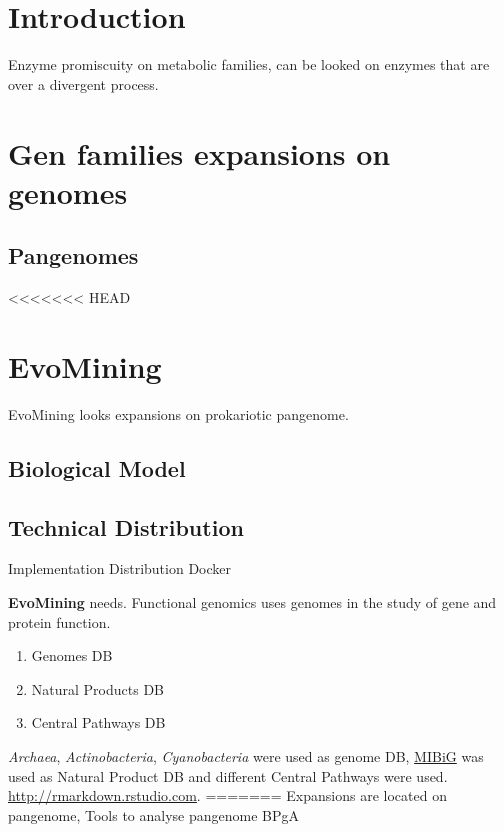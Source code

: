\documentclass[12pt,twoside]{reedthesis}
\providecommand{\tightlist}{%
  \setlength{\itemsep}{0pt}\setlength{\parskip}{0pt}}
\begin{document}
  \section{Introduction}\label{introduction-1}
  
  Enzyme promiscuity on metabolic families, can be looked on enzymes that
  are over a divergent process.
  
  \section{Gen families expansions on
  genomes}\label{gen-families-expansions-on-genomes}
  
  \subsection{Pangenomes}\label{pangenomes}
  
<<<<<<< HEAD
  \section{EvoMining}\label{evomining}
  
  EvoMining looks expansions on prokariotic pangenome.
  
  \subsection{Biological Model}\label{biological-model}
  
  \subsection{Technical Distribution}\label{technical-distribution}
  
  Implementation Distribution Docker
  
  \textbf{EvoMining} needs. Functional genomics uses genomes in the study
  of gene and protein function\protect\hyperlink{section}{}.
  
  \begin{enumerate}
  \def\labelenumi{\arabic{enumi}.}
  \tightlist
  \item
    Genomes DB
  \item
    Natural Products DB
  \item
    Central Pathways DB
  \end{enumerate}
  
  \emph{Archaea}, \emph{Actinobacteria}, \emph{Cyanobacteria} were used as
  genome DB, \href{http://mibig.secondarymetabolites.org/}{MIBiG} was used
  as Natural Product DB and different Central Pathways were used.
  \url{http://rmarkdown.rstudio.com}.
=======
  Expansions are located on pangenome, Tools to analyse pangenome BPgA
  
\end{document}
